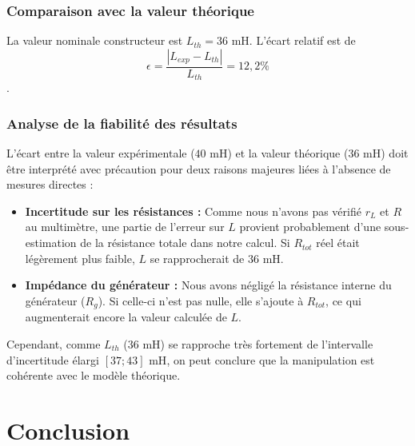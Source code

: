 \documentclass[a4paper,9pt,french]{scrartcl}
\begin{document}
\subsubsection{Comparaison avec la valeur théorique}
La valeur nominale constructeur est $L_{th} = 36 \text{ mH}$. 
L'écart relatif est de $$\epsilon = \frac{|L_{exp} - L_{th}|}{L_{th}} =12,2\%$$. 

\subsubsection{Analyse de la fiabilité des résultats}
L'écart entre la valeur expérimentale ($40 \text{ mH}$) et la valeur théorique ($36 \text{ mH}$) doit être interprété avec précaution pour deux raisons majeures liées à l'absence de mesures directes :

\begin{itemize}
    \item \textbf{Incertitude sur les résistances :} Comme nous n'avons pas vérifié $r_L$ et $R$ au multimètre, une partie de l'erreur sur $L$ provient probablement d'une sous-estimation de la résistance totale dans notre calcul. Si $R_{tot}$ réel était légèrement plus faible, $L$ se rapprocherait de $36 \text{ mH}$.
    \item \textbf{Impédance du générateur :} Nous avons négligé la résistance interne du générateur ($R_g$). Si celle-ci n'est pas nulle, elle s'ajoute à $R_{tot}$, ce qui augmenterait encore la valeur calculée de $L$.
\end{itemize}

Cependant, comme $L_{th}$ ($36 \text{ mH}$) se rapproche très fortement de l'intervalle d'incertitude élargi $[37 ; 43] \text{ mH}$, on peut conclure que la manipulation est cohérente avec le modèle théorique.



\section{Conclusion}


\end{document}
